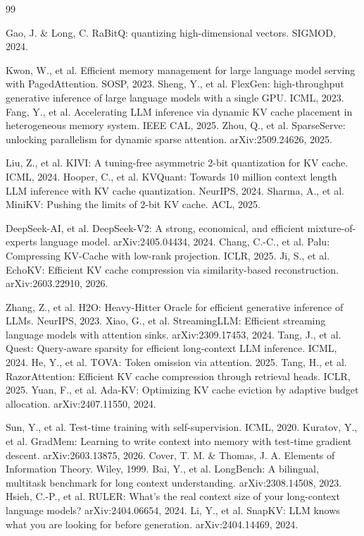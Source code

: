 \documentclass[11pt,a4paper]{article}
\theoremstyle{plain}
\theoremstyle{definition}
\begin{document}

\begin{thebibliography}{99}

 Gao, J. \& Long, C. RaBitQ: quantizing high-dimensional vectors. SIGMOD, 2024.

 Kwon, W., et al. Efficient memory management for large language model serving with PagedAttention. SOSP, 2023.
 Sheng, Y., et al. FlexGen: high-throughput generative inference of large language models with a single GPU. ICML, 2023.
 Fang, Y., et al. Accelerating LLM inference via dynamic KV cache placement in heterogeneous memory system. IEEE CAL, 2025.
 Zhou, Q., et al. SparseServe: unlocking parallelism for dynamic sparse attention. arXiv:2509.24626, 2025.

 Liu, Z., et al. KIVI: A tuning-free asymmetric 2-bit quantization for KV cache. ICML, 2024.
 Hooper, C., et al. KVQuant: Towards 10 million context length LLM inference with KV cache quantization. NeurIPS, 2024.
 Sharma, A., et al. MiniKV: Pushing the limits of 2-bit KV cache. ACL, 2025.

 DeepSeek-AI, et al. DeepSeek-V2: A strong, economical, and efficient mixture-of-experts language model. arXiv:2405.04434, 2024.
 Chang, C.-C., et al. Palu: Compressing KV-Cache with low-rank projection. ICLR, 2025.
 Ji, S., et al. EchoKV: Efficient KV cache compression via similarity-based reconstruction. arXiv:2603.22910, 2026.

 Zhang, Z., et al. H2O: Heavy-Hitter Oracle for efficient generative inference of LLMs. NeurIPS, 2023.
 Xiao, G., et al. StreamingLLM: Efficient streaming language models with attention sinks. arXiv:2309.17453, 2024.
 Tang, J., et al. Quest: Query-aware sparsity for efficient long-context LLM inference. ICML, 2024.
 He, Y., et al. TOVA: Token omission via attention. 2025.
 Tang, H., et al. RazorAttention: Efficient KV cache compression through retrieval heads. ICLR, 2025.
 Yuan, F., et al. Ada-KV: Optimizing KV cache eviction by adaptive budget allocation. arXiv:2407.11550, 2024.

 Sun, Y., et al. Test-time training with self-supervision. ICML, 2020.
 Kuratov, Y., et al. GradMem: Learning to write context into memory with test-time gradient descent. arXiv:2603.13875, 2026.
 Cover, T. M. \& Thomas, J. A. Elements of Information Theory. Wiley, 1999.
 Bai, Y., et al. LongBench: A bilingual, multitask benchmark for long context understanding. arXiv:2308.14508, 2023.
 Hsieh, C.-P., et al. RULER: What's the real context size of your long-context language models? arXiv:2404.06654, 2024.
 Li, Y., et al. SnapKV: LLM knows what you are looking for before generation. arXiv:2404.14469, 2024.

\end{thebibliography}
\end{document}
